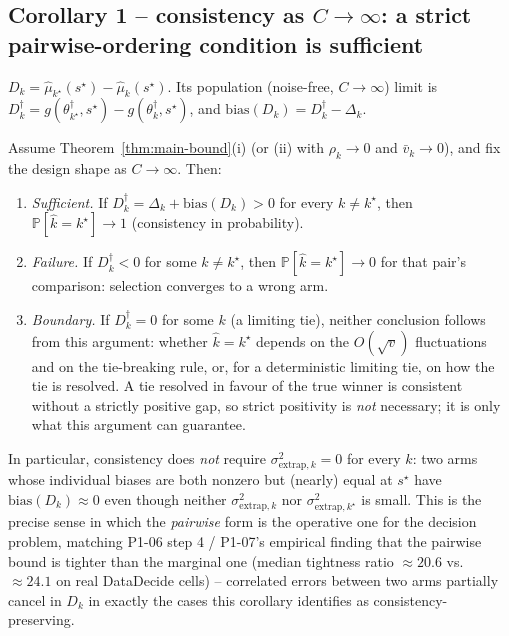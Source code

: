\subsection{Corollary 1 -- consistency as \texorpdfstring{$C \to \infty$}{C to infinity}:
a strict pairwise-ordering condition is sufficient}
\label{sec:corollary1}

\begin{definition}
\label{def:pairwise-d}
$D_k = \hat\mu_{k^\star}(s^\star) - \hat\mu_k(s^\star)$. Its population (noise-free,
$C \to \infty$) limit is $D_k^\dagger = g(\theta_{k^\star}^\dagger, s^\star) -
g(\theta_k^\dagger, s^\star)$, and $\mathrm{bias}(D_k) = D_k^\dagger - \Delta_k$.
\end{definition}

\begin{corollary}
\label{cor:pairwise}
Assume Theorem~\ref{thm:main-bound}(i) (or (ii) with $\rho_k \to 0$ and
$\bar v_k \to 0$), and fix the design shape as $C \to \infty$. Then:
\begin{enumerate}
  \item[(a)] \emph{Sufficient.} If $D_k^\dagger = \Delta_k + \mathrm{bias}(D_k) > 0$ for
    every $k \ne k^\star$, then $\mathbb{P}[\hat{k} = k^\star] \to 1$ (consistency in
    probability).
  \item[(b)] \emph{Failure.} If $D_k^\dagger < 0$ for some $k \ne k^\star$, then
    $\mathbb{P}[\hat{k} = k^\star] \to 0$ for that pair's comparison: selection converges
    to a wrong arm.
  \item[(c)] \emph{Boundary.} If $D_k^\dagger = 0$ for some $k$ (a limiting tie), neither
    conclusion follows from this argument: whether $\hat{k} = k^\star$ depends on the
    $O(\sqrt{v})$ fluctuations and on the tie-breaking rule, or, for a deterministic
    limiting tie, on how the tie is resolved. A tie resolved in favour of the true
    winner is consistent without a strictly positive gap, so strict positivity is
    \emph{not} necessary; it is only what this argument can guarantee.
\end{enumerate}
In particular, consistency does \emph{not} require $\sigma^2_{\mathrm{extrap}, k} = 0$
for every $k$: two arms whose individual biases are both nonzero but (nearly) equal at
$s^\star$ have $\mathrm{bias}(D_k) \approx 0$ even though neither
$\sigma^2_{\mathrm{extrap}, k}$ nor $\sigma^2_{\mathrm{extrap}, k^\star}$ is small. This
is the precise sense in which the \emph{pairwise} form is the operative one for the
decision problem, matching P1-06 step 4 / P1-07's empirical finding that the pairwise
bound is tighter than the marginal one (median tightness ratio $\approx 20.6$ vs.\
$\approx 24.1$ on real DataDecide cells) -- correlated errors between two arms partially
cancel in $D_k$ in exactly the cases this corollary identifies as consistency-preserving.
\end{corollary}

